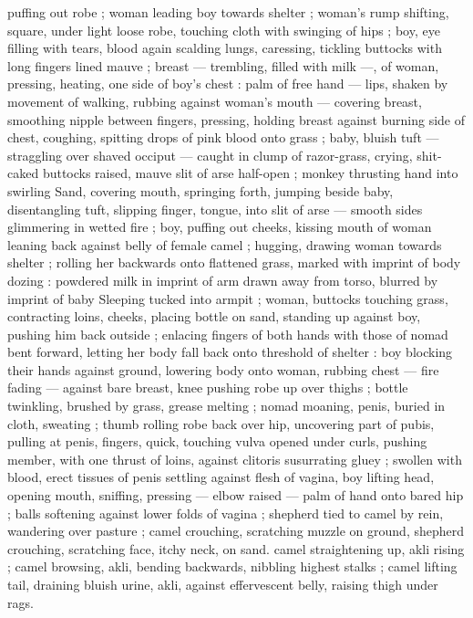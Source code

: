 puffing out robe ; woman leading boy towards shelter ; woman's
rump shifting, square, under light loose robe, touching cloth with
swinging of hips ; boy, eye filling with tears, blood again scalding
lungs, caressing, tickling buttocks with long fingers lined mauve ;
breast --- trembling, filled with milk ---, of woman, pressing, heating,
one side of boy's chest : palm of free hand --- lips, shaken by
movement of walking, rubbing against woman's mouth --- covering
breast, smoothing nipple between fingers, pressing, holding breast
against burning side of chest, coughing, spitting drops of pink blood
onto grass ; baby, bluish tuft --- straggling over shaved occiput ---
caught in clump of razor-grass, crying, shit-caked buttocks raised,
mauve slit of arse half-open ; monkey thrusting hand into swirling
Sand, covering mouth, springing forth, jumping beside baby,
disentangling tuft, slipping finger, tongue, into slit of arse --- smooth
sides glimmering in wetted fire ; boy, puffing out cheeks, kissing
mouth of woman leaning back against belly of female camel ;
hugging, drawing woman towards shelter ; rolling her backwards onto
flattened grass, marked with imprint of body dozing : powdered milk
in imprint of arm drawn away from torso, blurred by imprint of baby
Sleeping tucked into armpit ; woman, buttocks touching grass,
contracting loins, cheeks, placing bottle on sand, standing up against
boy, pushing him back outside ; enlacing fingers of both hands with
those of nomad bent forward, letting her body fall back onto
threshold of shelter : boy blocking their hands against ground,
lowering body onto woman, rubbing chest --- fire fading --- against
bare breast, knee pushing robe up over thighs ; bottle twinkling,
brushed by grass, grease melting ; nomad moaning, penis, buried in
cloth, sweating ; thumb rolling robe back over hip, uncovering part of
pubis, pulling at penis, fingers, quick, touching vulva opened under
curls, pushing member, with one thrust of loins, against clitoris
susurrating gluey ; swollen with blood, erect tissues of penis settling
against flesh of vagina, boy lifting head, opening mouth, sniffing,
pressing --- elbow raised --- palm of hand onto bared hip ; balls
softening against lower folds of vagina ; shepherd tied to camel by
rein, wandering over pasture ; camel crouching, scratching muzzle on
ground, shepherd crouching, scratching face, itchy neck, on sand.
camel straightening up, akli rising ; camel browsing, akli, bending
backwards, nibbling highest stalks ; camel lifting tail, draining bluish
urine, akli, against effervescent belly, raising thigh under rags.
